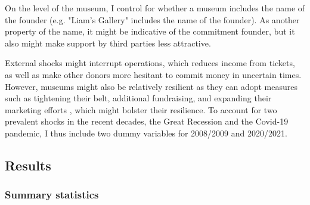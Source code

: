 \documentclass[12pt]{article}
\begin{document}
On the level of the museum, I control for whether a museum includes the name of the founder (e.g. "Liam's Gallery" includes the name of the founder).
As another property of the name, it might be indicative of the commitment founder, but it also might make support by third parties less attractive.

External shocks might interrupt operations, which reduces income from tickets, as well as make other donors more hesitant to commit money in uncertain times.
However, museums might also be relatively resilient as they can adopt measures such as tightening their belt, additional fundraising, and expanding their marketing efforts \parencite{Geller_Salamon_2010_resilience}, which might bolster their resilience.
To account for two prevalent shocks in the recent decades, the Great Recession and the Covid-19 pandemic, I thus include two dummy variables for 2008/2009 and 2020/2021.
\subsection*{Results}


\subsubsection*{Summary statistics}
\end{document}
